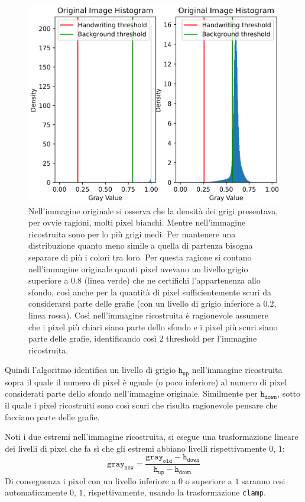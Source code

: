\begin{toDo}
	\begin{figure}[H]
		\centering
		\includegraphics[width=0.8\linewidth]{Figures/fft_diagrams.png}
		\caption[different density after fft compression]{Nell'immagine originale si osserva che la densità dei grigi presentava, per ovvie ragioni, molti pixel bianchi. Mentre nell'immagine ricostruita sono per lo più grigi medi. Per mantenere una distribuzione quanto meno simile a quella di partenza bisogna separare di più i colori tra loro. Per questa ragione si contano nell'immagine originale quanti pixel avevano un livello grigio superiore a $0.8$ (linea verde) che ne certifichi l'appartenenza allo sfondo, così anche per la quantità di pixel sufficientemente scuri da considerarsi parte delle grafie (con un livello di grigio inferiore a $0.2$, linea rossa). Così nell'immagine ricostruita è ragionevole assumere che i pixel più chiari siano parte dello sfondo e i pixel più scuri siano parte delle grafie, identificando così $2$ threshold per l'immagine ricostruita.}
		\label{fig:fft_diagrams}
	\end{figure}

	\noindent Quindi l'algoritmo identifica un livello di grigio $\texttt{h}_\texttt{up}$ nell'immagine ricostruita sopra il quale il numero di pixel è uguale (o poco inferiore) al numero di pixel considerati parte dello sfondo nell'immagine originale. Similmente per $\texttt{h}_\texttt{down}$, sotto il quale i pixel ricostruiti sono così scuri che risulta ragionevole pensare che facciano parte delle grafie.

	\noindent Noti i due estremi nell'immagine ricostruita, si esegue una trasformazione lineare dei livelli di pixel che fa sì che gli estremi abbiano livelli rispettivamente $0$, $1$:
	\[
		\texttt{gray}_\texttt{new} = \frac{\texttt{gray}_\texttt{old} - \texttt{h}_\texttt{down}}{\texttt{h}_\texttt{up} - \texttt{h}_\texttt{down}}
	\]
	Di conseguenza i pixel con un livello inferiore a $0$ o superiore a $1$ saranno resi automaticamente $0$, $1$, rispettivamente, usando la trasformazione \texttt{clamp}.


\end{toDo}
